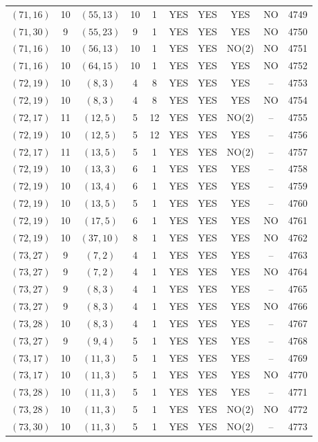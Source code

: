 \begin{longtable}{|c|c|c|c|c|c|c|c|c|c|}
$(71, 16)$ & 10 & $(55, 13)$ & 10 & 1 & YES & YES & YES & NO & 4749\\
$(71, 30)$ & 9 & $(55, 23)$ & 9 & 1 & YES & YES & YES & NO & 4750\\
$(71, 16)$ & 10 & $(56, 13)$ & 10 & 1 & YES & YES & NO(2) & NO & 4751\\
$(71, 16)$ & 10 & $(64, 15)$ & 10 & 1 & YES & YES & YES & NO & 4752\\
$(72, 19)$ & 10 & $(8, 3)$ & 4 & 8 & YES & YES & YES & -- & 4753\\
$(72, 19)$ & 10 & $(8, 3)$ & 4 & 8 & YES & YES & YES & NO & 4754\\
$(72, 17)$ & 11 & $(12, 5)$ & 5 & 12 & YES & YES & NO(2) & -- & 4755\\
$(72, 19)$ & 10 & $(12, 5)$ & 5 & 12 & YES & YES & YES & -- & 4756\\
$(72, 17)$ & 11 & $(13, 5)$ & 5 & 1 & YES & YES & NO(2) & -- & 4757\\
$(72, 19)$ & 10 & $(13, 3)$ & 6 & 1 & YES & YES & YES & -- & 4758\\
$(72, 19)$ & 10 & $(13, 4)$ & 6 & 1 & YES & YES & YES & -- & 4759\\
$(72, 19)$ & 10 & $(13, 5)$ & 5 & 1 & YES & YES & YES & -- & 4760\\
$(72, 19)$ & 10 & $(17, 5)$ & 6 & 1 & YES & YES & YES & NO & 4761\\
$(72, 19)$ & 10 & $(37, 10)$ & 8 & 1 & YES & YES & YES & NO & 4762\\
$(73, 27)$ & 9 & $(7, 2)$ & 4 & 1 & YES & YES & YES & -- & 4763\\
$(73, 27)$ & 9 & $(7, 2)$ & 4 & 1 & YES & YES & YES & NO & 4764\\
$(73, 27)$ & 9 & $(8, 3)$ & 4 & 1 & YES & YES & YES & -- & 4765\\
$(73, 27)$ & 9 & $(8, 3)$ & 4 & 1 & YES & YES & YES & NO & 4766\\
$(73, 28)$ & 10 & $(8, 3)$ & 4 & 1 & YES & YES & YES & -- & 4767\\
$(73, 27)$ & 9 & $(9, 4)$ & 5 & 1 & YES & YES & YES & -- & 4768\\
$(73, 17)$ & 10 & $(11, 3)$ & 5 & 1 & YES & YES & YES & -- & 4769\\
$(73, 17)$ & 10 & $(11, 3)$ & 5 & 1 & YES & YES & YES & NO & 4770\\
$(73, 28)$ & 10 & $(11, 3)$ & 5 & 1 & YES & YES & YES & -- & 4771\\
$(73, 28)$ & 10 & $(11, 3)$ & 5 & 1 & YES & YES & NO(2) & NO & 4772\\
$(73, 30)$ & 10 & $(11, 3)$ & 5 & 1 & YES & YES & NO(2) & -- & 4773\\

\end{longtable}
